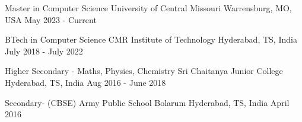 

\begin{cventries}

  \cventry
    {Master in Computer Science} %
    {University of Central Missouri} %
    {Warrensburg, MO, USA} %
    {May 2023 - Current} %
    {}%
    
  \cventry
    {BTech in Computer Science} %
    {CMR Institute of Technology} %
    {Hyderabad, TS, India} %
    {July 2018 - July 2022} %
     {}%
    
  \cventry
    {Higher Secondary - Maths, Physics, Chemistry} %
    {Sri Chaitanya Junior College} %
    {Hyderabad, TS, India} %
    {Aug 2016 - June 2018} %
     {}%

     
  \cventry
    {Secondary- (CBSE)} %
    {Army Public School Bolarum} %
    {Hyderabad, TS, India} %
    {April 2016} %
     {}%

\end{cventries}
